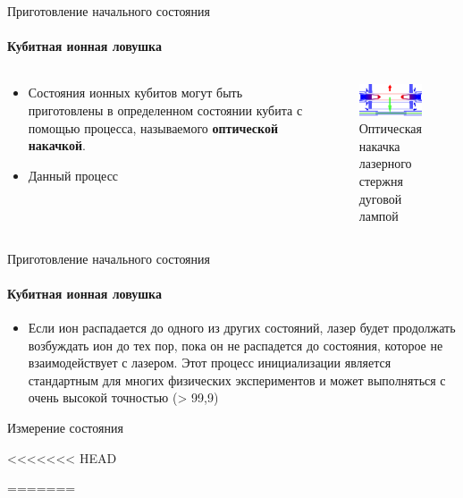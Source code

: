 \documentclass{beamer}
\begin{document}
    \begin{frame}{Приготовление начального состояния}
    \framesubtitle{Кубитная ионная ловушка}

    \begin{columns}

    \begin{column}{0.5\textwidth}

        \begin{itemize}
                \item <1-> Состояния ионных кубитов могут быть приготовлены в определенном состоянии кубита с помощью процесса, называемого \textbf{оптической накачкой}.
                \item <2-> Данный процесс
        \end{itemize}

    \end{column}

    \begin{column}{0.5\textwidth}

        \begin{figure}
            \centering
            \includegraphics[width=\textwidth]{media/optical-pumping.png}
            \caption{Оптическая накачка лазерного стержня дуговой лампой}
        \end{figure}

    \end{column}

    \end{columns}


    \end{frame}

    \begin{frame}{Приготовление начального состояния}
    \framesubtitle{Кубитная ионная ловушка}

    \begin{itemize}
            \item <1-> Если ион распадается до одного из других состояний, лазер будет продолжать возбуждать ион до тех пор, пока он не распадется до состояния, которое не взаимодействует с лазером. Этот процесс инициализации является стандартным для многих физических экспериментов и может выполняться с очень высокой точностью (> 99,9)
    \end{itemize}

    \end{frame}


    \begin{frame}{Измерение состояния}

<<<<<<< HEAD
    \end{frame}
=======
\end{document}

